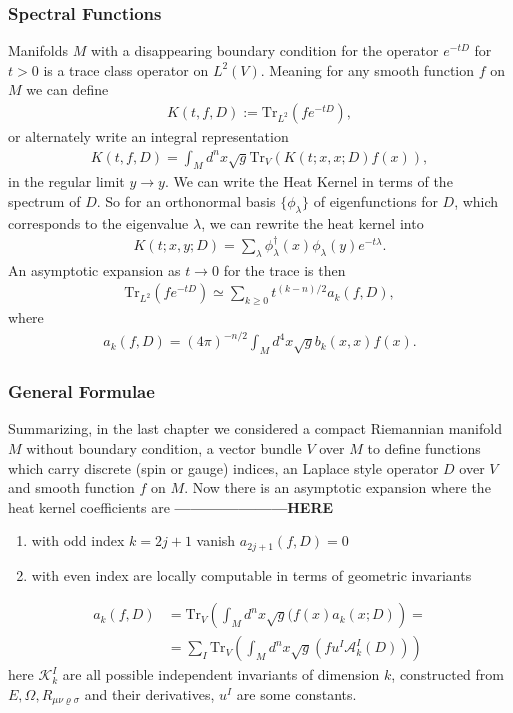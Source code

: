 \subsubsection{Spectral Functions}
Manifolds $M$ with a disappearing boundary condition for the operator $e^{-tD}$ for $t>0$ is a
trace class operator on $L^2(V)$. Meaning for any smooth function $f$ on $M$
we can define
\begin{align}
    K(t,f,D) := \text{Tr}_{L^2}(fe^{-tD}),
\end{align}
or alternately write an integral representation
\begin{align}
    K(t, f, D) = \int_M d^n x \sqrt{g} \text{Tr}_V(K(t;x,x;D)f(x)),
\end{align}
in the regular limit $y\rightarrow y$. We can write the Heat Kernel in terms
of the spectrum of $D$. So for an orthonormal basis $\{\phi_\lambda\}$ of
eigenfunctions for $D$, which corresponds to the eigenvalue $\lambda$, we
can rewrite the heat kernel into
\begin{align}
    K(t;x,y;D) = \sum_\lambda \phi^\dagger_\lambda(x)
    \phi_\lambda(y)e^{-t\lambda}.
\end{align}
An asymptotic expansion as $t \rightarrow 0$ for the trace is then
\begin{align}
    \text{Tr}_{L^2}(fe^{-tD}) \simeq \sum_{k\geq 0}t^{(k-n)/2}a_k(f,D),
\end{align}
where
\begin{align}
    a_k(f,D) = (4\pi)^{-n/2} \int_M d^4x \sqrt{g} b_k(x,x) f(x).
\end{align}
\subsubsection{General Formulae}
Summarizing, in the last chapter we considered a compact Riemannian manifold
$M$ without boundary condition, a vector bundle $V$ over $M$ to define
functions which carry discrete (spin or gauge) indices, an Laplace style
operator $D$ over $V$ and smooth function $f$ on $M$. Now there is an asymptotic
expansion where the heat kernel coefficients are
\newline
\textbf{---------------------HERE}
\newline
\begin{enumerate}
    \item with odd index $k=2j+1$ vanish $a_{2j+1}(f,D) = 0$
    \item with even index are locally computable in terms of geometric
        invariants
\end{enumerate}
\begin{align}
    a_k(f,D) &= \text{Tr}_V\left(\int_M d^n x\sqrt{g}(f(x)a_k(x;D)\right) =\\
    &=\sum_I \text{Tr}_V\left(\int_M d^nx \sqrt{g}(fu^I \mathcal{A}^I_k(D))\right)
\end{align}
here $\mathcal{K}^I_k$ are all possible independent invariants of dimension
$k$, constructed from $E, \Omega, R_{\mu\nu\varrho\sigma}$ and their
derivatives, $u^I$ are some constants.

